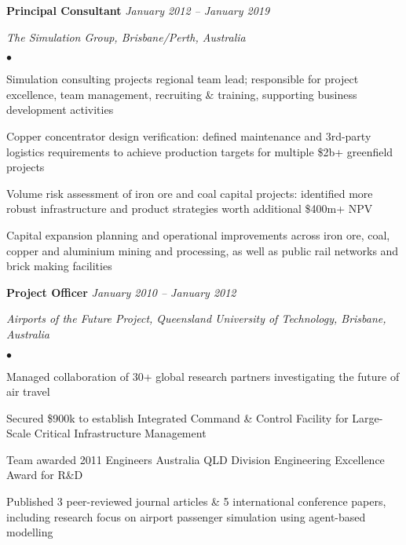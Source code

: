 \documentclass[margin,line]{resume}
\newenvironment{list1}{
  \begin{list}{}{%
      \setlength{\itemsep}{0in}
      \setlength{\parsep}{0in} \setlength{\parskip}{0in}
      \setlength{\topsep}{0in} \setlength{\partopsep}{0in}
      \setlength{\leftmargin}{0.17in}}}{\end{list}}
\newenvironment{list2}{
  \begin{list}{$\bullet$}{%
      \setlength{\itemsep}{0in}
      \setlength{\parsep}{0in} \setlength{\parskip}{0in}
      \setlength{\topsep}{0in} \setlength{\partopsep}{0in}
      \setlength{\leftmargin}{0.2in}}}{\end{list}}
\begin{document}
\begin{resume}
{\textbf{Principal Consultant}} \hfill {\it January 2012 -- January 2019}\\
\vspace{-0.85\baselineskip}
\begin{list1}
\item {\it The Simulation Group, Brisbane/Perth, Australia}
\begin{list2}
\item Simulation consulting projects regional team lead; responsible for project excellence, team management, recruiting \& training, supporting business development activities
\item Copper concentrator design verification: defined maintenance and 3rd-party logistics requirements to achieve production targets for multiple \$2b+ greenfield projects
\item Volume risk assessment of iron ore and coal capital projects: identified more robust infrastructure and product strategies worth additional \$400m+ NPV
\item Capital expansion planning and operational improvements across iron ore, coal, copper and aluminium mining and processing, as well as public rail networks and brick making facilities
\end{list2}
\end{list1}

\newpage

{\textbf{Project Officer}} \hfill {\it January 2010 -- January 2012}\\
\vspace{-0.85\baselineskip}
\begin{list1}
\item {\it Airports of the Future Project, Queensland University of Technology, Brisbane, Australia}
\begin{list2}
\item Managed collaboration of 30+ global research partners investigating the future of air travel
\item Secured \$900k to establish Integrated Command \& Control Facility for Large-Scale Critical Infrastructure Management
\item Team awarded 2011 Engineers Australia QLD Division Engineering Excellence Award for R\&D
\item Published 3 peer-reviewed journal articles \& 5 international conference papers, including research focus on airport passenger simulation using agent-based modelling
\end{list2}
\end{list1}


\end{resume}
\end{document}
